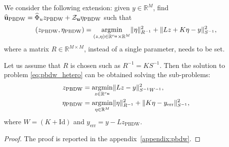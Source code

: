 \begin{problem} We consider the following extension: given $y \in \mathbb R^M$, find $\widehat{\mathbf u}_{\rm PBDW} = \widehat{\Phi}_{u} z_{\rm PBDW} +  \mathcal{Z}_{\mathbf u} \eta_{\rm PBDW}$ such that 
  \begin{equation}
    \label{eq:pbdw_hetero}
    (z_{\text{PBDW}}, \eta_{\text{PBDW}}) = \operatorname*{\arg\!\min}_{(z, \eta)\in\mathbb{R}^{r_{\mathbf u}}\times \mathbb{R}^M}\lVert\eta\rVert^2_{R^{-1}}+\lVert Lz + K\eta-y\rVert^{2}_{S^{-1}},
  \end{equation}
where a matrix $R\in\mathbb{R}^{M\times M}$, instead of a single parameter, needs to be set.
\end{problem}


\begin{theorem}
  \label{theo:pbdw}
Let us assume that $R$ is chosen such as $R^{-1}=KS^{-1}$. Then the solution to problem \eqref{eq:pbdw_hetero} can be obtained solving the sub-problems:
  \begin{eqnarray}
    z_{\text{PBDW}} & = \operatorname*{\arg\!\min}_{z\in\mathbb{R}^{r_{\mathbf u}}} \lVert Lz-y\rVert^2_{S^{-1}W^{-1}},\label{eq:pbdw_sub1}\\
    \eta_{\text{PBDW}} & = \operatorname*{\arg\!\min}_{\eta\in \mathbb{R}^M}\lVert\eta\rVert^2_{R^{-1}}+\lVert K\eta-y_{\text{err}}\rVert^2_{S^{-1}}, \label{eq:pbdw_sub2}
  \end{eqnarray}
  where $W = (K + \text{Id})$ and $y_{\text{err}}=y-Lz_{\text{PBDW}}$.
\end{theorem}
\begin{proof}
  The proof is reported in the appendix~\ref{appendix:pbdw}.
\end{proof}
